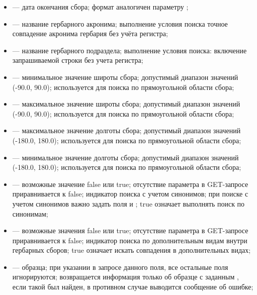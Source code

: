 \documentclass[letterpaper,10pt,russian]{sphinxmanual}
\begin{document}
\begin{itemize}
\item {} 
 — дата окончания сбора; формат аналогичен параметру ;

\item {} 
 — название гербарного акронима; выполнение условия поиска \textendash{} точное совпадение акронима гербария без учёта регистра;

\item {} 
 — название гербарного подраздела; выполнение условия поиска: включение запрашиваемой строки без учета регистра;

\item {} 
 — минимальное значение широты сбора; допустимый диапазон значений (-90.0, 90.0); используется для поиска по прямоугольной области сбора;

\item {} 
 — максимальное значение широты сбора; допустимый диапазон значений (-90.0, 90.0); используется для поиска по прямоугольной области сбора;

\item {} 
 — максимальное значение долготы сбора; допустимый диапазон значений (-180.0, 180.0); используется для поиска по прямоугольной области сбора;

\item {} 
 — минимальное значение долготы сбора; допустимый диапазон значений (-180.0, 180.0); используется для поиска по прямоугольной области сбора;

\item {} 
 — возможные значение false или true; отсутствие параметра в GET-запросе приравнивается к false; индикатор поиска с учетом синонимов; при поиске с учетом синонимов важно задать поля  и ; true \textendash{} означает выполнять поиск по синонимам;

\item {} 
 — возможные значения false или true; отсутствие параметра в GET-запросе приравнивается к false; индикатор поиска по дополнительным видам внутри гербарных сборов; true \textendash{} означает искать совпадения в дополнительных видах;

\item {} 
 —  образца; при указании в запросе данного поля, все остальные поля игнорируются; возвращается информация только об образце с заданным , если такой был найден, в противном случае \textendash{} выводится сообщение об ошибке;


\end{itemize}
\end{document}
